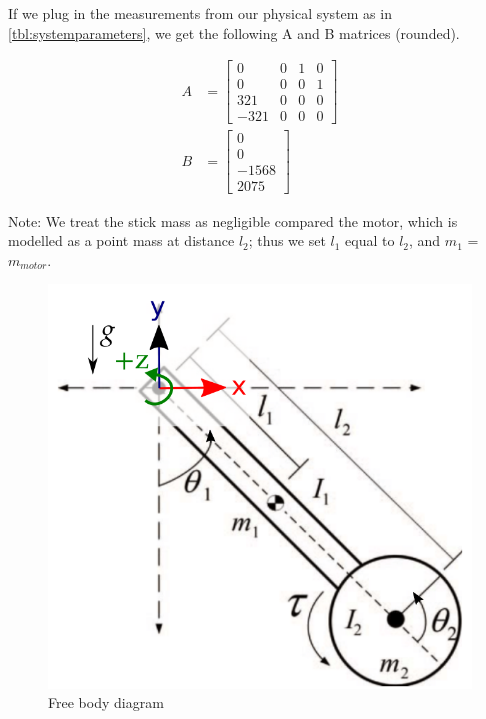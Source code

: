 \documentclass[conference]{IEEEtran}
\begin{document}
If we plug in the measurements from our physical system as in
\cref{tbl:systemparameters}, we get the following A and B matrices (rounded).






\begin{align}
    A &= 
    \begin{bmatrix}
        0 & 0 & 1 & 0 \\
        0 & 0 & 0 & 1 \\
        321 & 0 & 0 & 0 \\
        -321  & 0 & 0 & 0
    \end{bmatrix} \\
    B &=  
    \begin{bmatrix}
        0 \\
        0 \\
        -1568\\
       2075 
    \end{bmatrix}
\end{align}

Note: We treat the stick mass as negligible compared the motor, which is
modelled as a point mass at distance $l_2$; thus we set $l_1$ equal to $l_2$,
and $m_1$ = $m_{motor}$.

\begin{figure}[!t]
    \centering
    \includegraphics[width=0.5\linewidth]{images/freebody.png}
    \caption{Free body diagram}
    \label{}
\end{figure}
\end{document}
